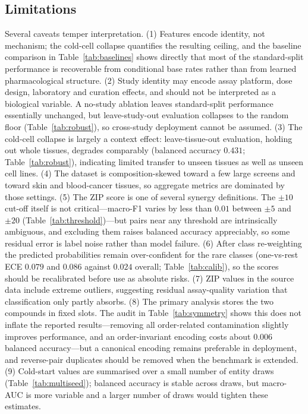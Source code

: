 \documentclass[11pt]{article}
\begin{document}
\subsection{Limitations}
Several caveats temper interpretation. (1) Features encode identity, not mechanism; the cold-cell
collapse quantifies the resulting ceiling, and the baseline comparison in Table~\ref{tab:baselines}
shows directly that most of the standard-split performance is recoverable from conditional base rates
rather than from learned pharmacological structure. (2) Study identity may encode assay platform, dose design,
laboratory and curation effects, and should not be interpreted as a biological variable. A no-study
ablation leaves standard-split performance essentially unchanged, but leave-study-out evaluation
collapses to the random floor (Table~\ref{tab:robust}), so cross-study deployment cannot be assumed.
(3) The cold-cell collapse is largely a context effect: leave-tissue-out
evaluation, holding out whole tissues, degrades comparably (balanced accuracy $0.431$;
Table~\ref{tab:robust}), indicating limited transfer to
unseen tissues as well as unseen cell lines. (4) The dataset is composition-skewed
toward a few large screens and toward skin and blood-cancer tissues, so aggregate metrics are dominated
by those settings. (5) The ZIP score is one of several synergy definitions. The $\pm 10$ cut-off itself
is not critical---macro-F1 varies by less than $0.01$ between $\pm 5$ and $\pm 20$
(Table~\ref{tab:threshold})---but pairs near any threshold are intrinsically ambiguous, and excluding
them raises balanced accuracy appreciably, so some residual error is label noise rather than model
failure. (6) After class re-weighting the predicted probabilities remain over-confident for the rare
classes (one-vs-rest ECE $0.079$ and $0.086$ against $0.024$ overall; Table~\ref{tab:calib}), so the
scores should be recalibrated before use as absolute risks. (7) ZIP values in the source data include extreme outliers,
suggesting residual assay-quality variation that classification only partly absorbs. (8) The primary
analysis stores the two compounds in fixed slots. The audit in Table~\ref{tab:symmetry} shows this does
not inflate the reported results---removing all order-related contamination slightly improves
performance, and an order-invariant encoding costs about $0.006$ balanced accuracy---but a canonical
encoding remains preferable in deployment, and reverse-pair duplicates should be removed when the
benchmark is extended. (9) Cold-start values are summarised over a small number of entity draws
(Table~\ref{tab:multiseed}); balanced accuracy is stable across draws, but macro-AUC is more variable
and a larger number of draws would tighten these estimates.
\end{document}
